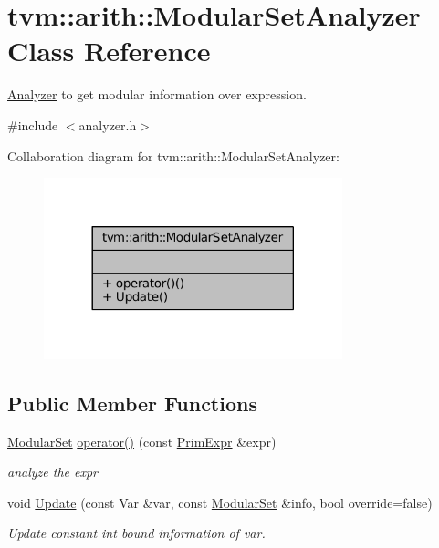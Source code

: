 \hypertarget{classtvm_1_1arith_1_1ModularSetAnalyzer}{}\section{tvm\+:\+:arith\+:\+:Modular\+Set\+Analyzer Class Reference}
\label{classtvm_1_1arith_1_1ModularSetAnalyzer}


\hyperlink{classtvm_1_1arith_1_1Analyzer}{Analyzer} to get modular information over expression.  




{\ttfamily \#include $<$analyzer.\+h$>$}



Collaboration diagram for tvm\+:\+:arith\+:\+:Modular\+Set\+Analyzer\+:
\nopagebreak
\begin{figure}[H]
\begin{center}
\leavevmode
\includegraphics[width=245pt]{classtvm_1_1arith_1_1ModularSetAnalyzer__coll__graph}
\end{center}
\end{figure}
\subsection*{Public Member Functions}
\begin{DoxyCompactItemize}
\item 
\hyperlink{classtvm_1_1arith_1_1ModularSet}{Modular\+Set} \hyperlink{classtvm_1_1arith_1_1ModularSetAnalyzer_a57c3c62ebc821f5f01bc2b43f06488da}{operator()} (const \hyperlink{classtvm_1_1PrimExpr}{Prim\+Expr} \&expr)
\begin{DoxyCompactList}\small\item\em analyze the expr \end{DoxyCompactList}\item 
void \hyperlink{classtvm_1_1arith_1_1ModularSetAnalyzer_a798cd8c3a1c5cae3c84080373c6913e9}{Update} (const Var \&var, const \hyperlink{classtvm_1_1arith_1_1ModularSet}{Modular\+Set} \&info, bool override=false)
\begin{DoxyCompactList}\small\item\em Update constant int bound information of var. \end{DoxyCompactList}\end{DoxyCompactItemize}
